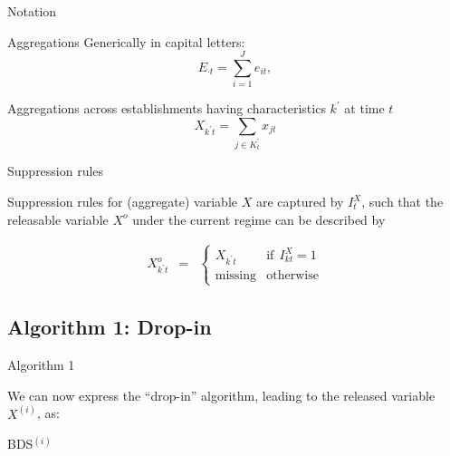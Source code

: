 \begin{frame}{Notation}
\begin{block}{Aggregations}
Generically in capital letters:
\begin{equation}
\label{eq:national_e}
E_{\cdot t} = \sum_{i=1}^J e_{it},
\end{equation}

Aggregations across establishments having characteristics $k^\prime$ at 
time $t$
\begin{equation}
\label{eq:sum_X}
X_{k^\prime t} =  \sum_{j \in K_t^\prime} x_{jt}
\end{equation}
\end{block}
\end{frame}

\begin{frame}{Suppression rules }
\begin{block}{Suppression rules}
for (aggregate) variable $X$ are captured by $I_{t}^X$, such that the 
releasable variable $X^o$  under the current regime can be described by

\begin{eqnarray}
\label{eq:supp_x}
X_{k^\prime t}^o &=& \left \lbrace 
\begin{array}{rl}
X_{k^\prime t} &\mbox{if}~~  I_{kt}^X = 1 \\
\mbox{missing} &\mbox{otherwise}
\end{array} \right .
\end{eqnarray}
\end{block}
\end{frame}



\subsection{Algorithm 1: Drop-in}
\begin{frame}[fragile]{Algorithm 1}

We can now express the ``drop-in'' algorithm, leading to the released variable $X^{(i)}$, as:
\begin{block}{BDS$^{(i)}$}
\begin{algorithm}
\begin{algorithmic}
\Else
\EndIf
\end{algorithmic}
\end{algorithm}
\end{block}
\end{frame}

